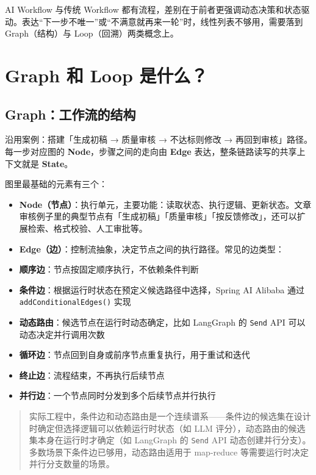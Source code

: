 \documentclass[9pt,a4paper,twocolumn]{ctexart}
\begin{document}
AI Workflow 与传统 Workflow 都有流程，差别在于前者更强调动态决策和状态驱动。表达“下一步不唯一”或“不满意就再来一轮”时，线性列表不够用，需要落到 Graph（结构）与 Loop（回溯）两类概念上。



\section*{Graph 和 Loop 是什么？}


\subsection*{Graph：工作流的结构}


沿用案例：搭建「生成初稿 → 质量审核 → 不达标则修改 → 再回到审核」路径。每一步对应图的 \textbf{Node}，步骤之间的走向由 \textbf{Edge} 表达，整条链路读写的共享上下文就是 \textbf{State}。



图里最基础的元素有三个：


\begin{itemize}[itemsep=1pt, topsep=2pt]
  \item \textbf{Node（节点）}：执行单元，主要功能：读取状态、执行逻辑、更新状态。文章审核例子里的典型节点有「生成初稿」「质量审核」「按反馈修改」，还可以扩展检索、格式校验、人工审批等。
  \item \textbf{Edge（边）}：控制流抽象，决定节点之间的执行路径。常见的边类型：
  \item \textbf{顺序边}：节点按固定顺序执行，不依赖条件判断
  \item \textbf{条件边}：根据运行时状态在预定义候选路径中选择，Spring AI Alibaba 通过 \texttt{addConditionalEdges()} 实现
  \item \textbf{动态路由}：候选节点在运行时动态确定，比如 LangGraph 的 \texttt{Send} API 可以动态决定并行调用次数
  \item \textbf{循环边}：节点回到自身或前序节点重复执行，用于重试和迭代
  \item \textbf{终止边}：流程结束，不再执行后续节点
  \item \textbf{并行边}：一个节点同时分发到多个后续节点并行执行
\end{itemize}


\begin{quote}
实际工程中，条件边和动态路由是一个连续谱系——条件边的候选集在设计时确定但选择逻辑可以依赖运行时状态（如 LLM 评分），动态路由的候选集本身在运行时才确定（如 LangGraph 的 \texttt{Send} API 动态创建并行分支）。多数场景下条件边已够用，动态路由适用于 map-reduce 等需要运行时决定并行分支数量的场景。
\end{quote}
\end{document}
